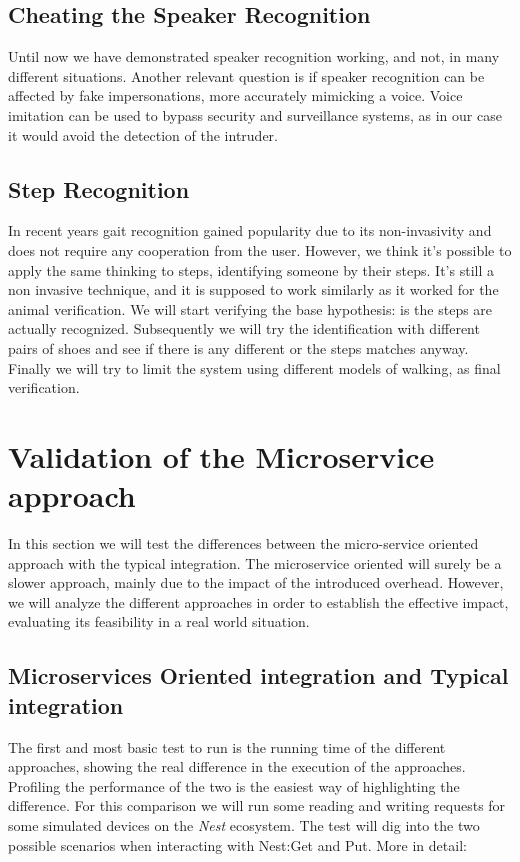 \subsection{Cheating the Speaker Recognition}

Until now we have demonstrated speaker recognition working, and not, in many different situations.
Another relevant question is if speaker recognition can be affected by fake impersonations,
more accurately mimicking a voice. Voice imitation can be used to bypass security and
surveillance systems, as in our case it would avoid the detection of the intruder.

\subsection{Step Recognition}

In recent years gait recognition gained popularity due to its
non-invasivity and does not require any cooperation from the user.
However, we think it's possible to apply the same thinking to steps,
identifying someone by their steps. It's still a non invasive technique,
and it is supposed to work similarly as it worked for the animal verification.
We will start verifying the base hypothesis: is the steps are actually recognized.
Subsequently we will try the identification with different pairs of shoes and see if
there is any different or the steps matches anyway. Finally we will try to limit the system
using different models of walking, as final verification.

\section{Validation of the Microservice approach}

In this section we will test the differences between the micro-service
oriented approach with the typical integration. The microservice oriented
will surely be a slower approach, mainly due to the impact of the introduced
overhead. However, we will analyze the different approaches in order to establish
the effective impact, evaluating its feasibility in a real world situation.



\subsection{Microservices Oriented integration and Typical integration}

The first and most basic test to run is the running time of the different approaches,
showing the real difference in the execution of the approaches. Profiling the performance
of the two is the easiest way of highlighting the difference.\newline
For this comparison we will run some reading and writing requests for some simulated devices
on the \textit{Nest} ecosystem. The test will dig into the two possible scenarios when interacting with
Nest:Get and Put. More in detail:


